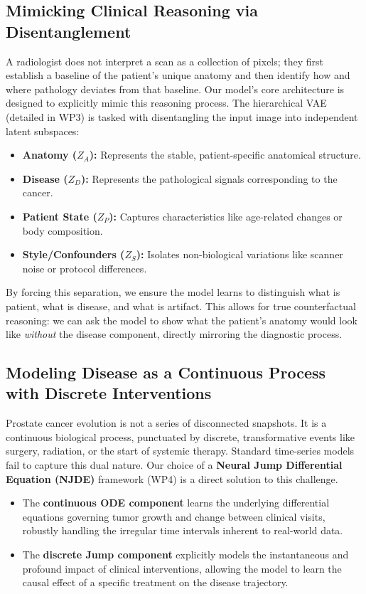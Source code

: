 \documentclass[11pt, a4paper]{article}
\begin{document}
\subsection{Mimicking Clinical Reasoning via Disentanglement}
A radiologist does not interpret a scan as a collection of pixels; they first establish a baseline of the patient's unique anatomy and then identify how and where pathology deviates from that baseline. Our model's core architecture is designed to explicitly mimic this reasoning process. The hierarchical VAE (detailed in WP3) is tasked with disentangling the input image into independent latent subspaces:
\begin{itemize}
    \item \textbf{Anatomy ($Z_A$):} Represents the stable, patient-specific anatomical structure.
    \item \textbf{Disease ($Z_D$):} Represents the pathological signals corresponding to the cancer.
    \item \textbf{Patient State ($Z_P$):} Captures characteristics like age-related changes or body composition.
    \item \textbf{Style/Confounders ($Z_S$):} Isolates non-biological variations like scanner noise or protocol differences.
\end{itemize}
By forcing this separation, we ensure the model learns to distinguish what is patient, what is disease, and what is artifact. This allows for true counterfactual reasoning: we can ask the model to show what the patient's anatomy would look like \textit{without} the disease component, directly mirroring the diagnostic process.

\subsection{Modeling Disease as a Continuous Process with Discrete Interventions}
Prostate cancer evolution is not a series of disconnected snapshots. It is a continuous biological process, punctuated by discrete, transformative events like surgery, radiation, or the start of systemic therapy. Standard time-series models fail to capture this dual nature. Our choice of a \textbf{Neural Jump Differential Equation (NJDE)} framework (WP4) is a direct solution to this challenge.
\begin{itemize}
    \item The \textbf{continuous ODE component} learns the underlying differential equations governing tumor growth and change between clinical visits, robustly handling the irregular time intervals inherent to real-world data.
    \item The \textbf{discrete Jump component} explicitly models the instantaneous and profound impact of clinical interventions, allowing the model to learn the causal effect of a specific treatment on the disease trajectory.
\end{itemize}
\end{document}
